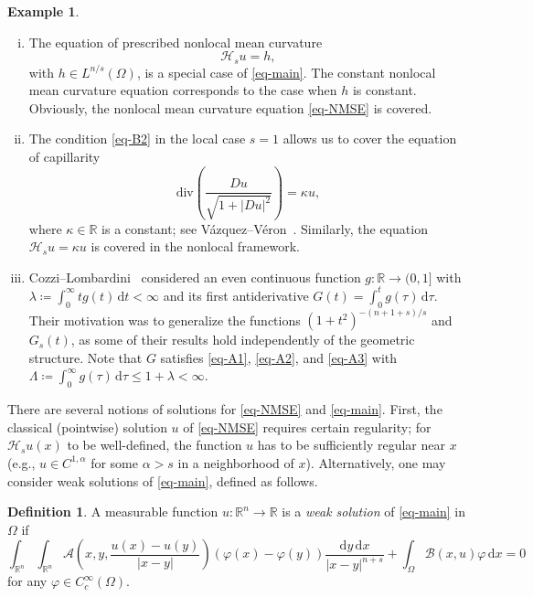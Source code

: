 \documentclass{amsart}
\theoremstyle{plain}
\theoremstyle{definition}
\newtheorem{definition}[theorem]{Definition}
\newtheorem{example}[theorem]{Example}
\numberwithin{equation}{section}
\begin{document}
\begin{example}\label{examples}
\begin{enumerate}[(i)]
\item
The equation of prescribed nonlocal mean curvature
\begin{equation*}
\mathscr{H}_su=h,
\end{equation*}
with $h \in L^{n/s}(\Omega)$, is a special case of \eqref{eq-main}. The constant nonlocal mean curvature equation corresponds to the case when $h$ is constant. Obviously, the nonlocal mean curvature equation \eqref{eq-NMSE} is covered.
\item
The condition \eqref{eq-B2} in the local case $s=1$ allows us to cover the equation of capillarity
\begin{equation*}
\mathrm{div}\left( \frac{Du}{\sqrt{1+|Du|^2}} \right) = \kappa u,
\end{equation*}
where $\kappa \in \mathbb{R}$ is a constant; see V\'azquez--V\'eron~\cite{VV81}. Similarly, the equation $\mathscr{H}_su=\kappa u$ is covered in the nonlocal framework.
\item
Cozzi--Lombardini~\cite{CL21} considered an even continuous function $g: \mathbb{R} \to (0,1]$ with $\lambda \coloneqq \int_0^\infty tg(t) \,\mathrm{d}t < \infty$ and its first antiderivative $G(t) = \int_0^t g(\tau)\,\mathrm{d}\tau$. Their motivation was to generalize the functions $(1+t^2)^{-(n+1+s)/s}$ and $G_s(t)$, as some of their results hold independently of the geometric structure. Note that $G$ satisfies \eqref{eq-A1}, \eqref{eq-A2}, and \eqref{eq-A3} with $\Lambda \coloneqq \int_0^\infty g(\tau)\,\mathrm{d}\tau \leq 1+\lambda<\infty$.
\end{enumerate}
\end{example}

There are several notions of solutions for \eqref{eq-NMSE} and \eqref{eq-main}. First, the classical (pointwise) solution $u$ of \eqref{eq-NMSE} requires certain regularity; for $\mathscr{H}_su(x)$ to be well-defined, the function $u$ has to be sufficiently regular near $x$ (e.g., $u \in C^{1, \alpha}$ for some $\alpha > s$ in a neighborhood of $x$). Alternatively, one may consider weak solutions of \eqref{eq-main}, defined as follows.

\begin{definition}\label{def-weak}
A measurable function $u: \mathbb{R}^n \to \mathbb{R}$ is a \emph{weak solution} of \eqref{eq-main} in $\Omega$ if
\begin{equation}\label{eq-main-weak}
\int_{\mathbb{R}^n} \int_{\mathbb{R}^n} \mathscr{A} \left( x, y, \frac{u(x)-u(y)}{|x-y|} \right) (\varphi(x)-\varphi(y)) \frac{\mathrm{d}y \,\mathrm{d}x}{|x-y|^{n+s}} + \int_{\Omega} \mathscr{B}(x, u)\varphi \,\mathrm{d}x = 0
\end{equation}
for any $\varphi \in C^\infty_c(\Omega)$.
\end{definition}
\end{document}

